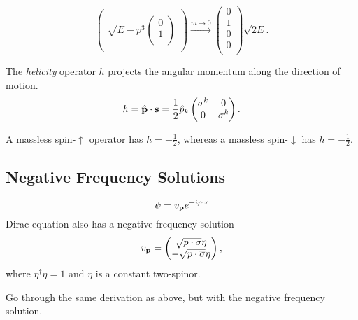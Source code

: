 \begin{example}[$\vb{p} = 0$]
\begin{equation}
\begin{pmatrix}
    \\
    \sqrt{E - p^3}
    \begin{pmatrix}
    0 \\
    1 \\
    \end{pmatrix}
    \\
    \end{pmatrix}
    \xrightarrow{m \to 0}
    \begin{pmatrix}
    0 \\
    1 \\
    0 \\
    0 \\
    \end{pmatrix} \sqrt{2 E}.
    \label{eq:16-m2}
  \end{equation}
\end{example}

\begin{definition}[helicity]
  The \emph{helicity} operator $h$ projects the angular momentum along the direction of motion.
  \begin{equation}
    h = \hat{\vb{p}} \cdot \vb{s} = \frac{1}{2} \hat p_{k}
    \begin{pmatrix}
     \sigma^{k} & 0 \\
     0 & \sigma^{k} \\
    \end{pmatrix}.
  \end{equation}
\end{definition}
A massless spin-$\uparrow$ operator has $h = + \frac{1}{2}$, whereas a massless spin-$\downarrow$ has $h = -\frac{1}{2}$.

\subsection{Negative Frequency Solutions}%
\label{sub:negative_frequency_solutions}

\begin{equation}
  \psi = v_{\vb{p}} e^{+i p \cdot x}
\end{equation}
Dirac equation also has a negative frequency solution
\begin{equation}
  v_{\vb{p}} = 
  \begin{pmatrix}
  \sqrt{p \cdot \sigma} \eta \\
  - \sqrt{p \cdot \overline{\sigma}} \eta \\
  \end{pmatrix},
\end{equation}
where $\eta^{\dagger} \eta = 1$ and $\eta$ is a constant two-spinor.
\begin{exercise}
  Go through the same derivation as above, but with the negative frequency solution.
\end{exercise}

